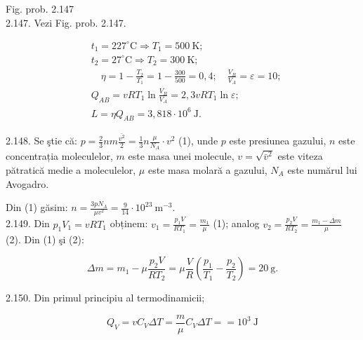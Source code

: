 \documentclass[10pt]{article}
\begin{document}
Fig. prob. 2.147\\
2.147. Vezi Fig. prob. 2.147.

$$
\begin{aligned}
& t_{1}=227^{\circ} \mathrm{C} \Rightarrow T_{1}=500 \mathrm{~K} ; \\
& t_{2}=27^{\circ} \mathrm{C} \Rightarrow T_{2}=300 \mathrm{~K} ; \\
& \quad \eta=1-\frac{T_{2}}{T_{1}}=1-\frac{300}{500}=0,4 ; \quad \frac{V_{B}}{V_{A}}=\varepsilon=10 ; \\
& Q_{A B}=v R T_{1} \ln \frac{V_{B}}{V_{A}}=2,3 v R T_{1} \ln \varepsilon ; \\
& L=\eta Q_{A B}=3,818 \cdot 10^{6} \mathrm{~J} .
\end{aligned}
$$

2.148. Se ştie că: $p=\frac{2}{3} n m \frac{\overline{v^{2}}}{2}=\frac{1}{3} n \frac{\mu}{N_{A}} \cdot v^{2}$ (1), unde $p$ este presiunea gazului, $n$ este concentrația moleculelor, $m$ este masa unei molecule, $v=\sqrt{\bar{v}^{2}}$ este viteza pătratică medie a moleculelor, $\mu$ este masa molară a gazului, $N_{A}$ este numărul lui Avogadro.

Din (1) găsim: $n=\frac{3 p N_{A}}{\mu v^{2}}=\frac{9}{14} \cdot 10^{23} \mathrm{~m}^{-3}$.\\
2.149. Din $p_{1} V_{1}=v R T_{1}$ obținem: $v_{1}=\frac{p_{1} V}{R T_{1}}=\frac{m_{1}}{\mu}$ (1); analog $v_{2}=\frac{p_{2} V}{R T_{2}}=\frac{m_{1}-\Delta m}{\mu}$ (2). Din (1) şi (2):

$$
\Delta m=m_{1}-\mu \frac{p_{2} V}{R T_{2}}=\mu \frac{V}{R}\left(\frac{p_{1}}{T_{1}}-\frac{p_{2}}{T_{2}}\right)=20 \mathrm{~g} .
$$

2.150. Din primul principiu al termodinamicii;

$$
Q_{V}=v C_{V} \Delta T=\frac{m}{\mu} C_{V} \Delta T==10^{3} \mathrm{~J}
$$
\end{document}

